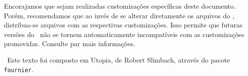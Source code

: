 \documentclass[
	10pt,				%
	openright,			%
	twoside,			%
	a5paper,			%
	english,			%
	french,				%
	spanish,			%
	brazil,				%
	sumario=tradicional
]{abntex2}
\begin{document}
Encorajamos que sejam realizadas customizações específicas deste documento.
Porém, recomendamos que ao invés de se alterar diretamente os arquivos do
\abnTeX, distribua-se arquivos com as respectivas customizações.
Isso permite que futuras versões do \abnTeX~não se tornem automaticamente
incompatíveis com as customizações promovidas. Consulte
 par mais informações.


~\vfill Este texto foi composto em Utopia, de Robert Slimbach, através do pacote \texttt{fournier}.
\end{document}
